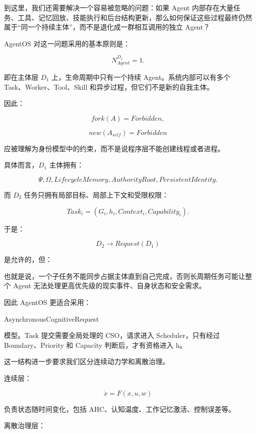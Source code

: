 到这里，我们还需要解决一个容易被忽略的问题：如果 Agent 内部存在大量任务、工具、记忆回放、技能执行和后台结构更新，那么如何保证这些过程最终仍然属于“同一个持续主体”，而不是退化成一群相互调用的独立 Agent？

AgentOS 对这一问题采用的基本原则是：

\[
\boxed{
N^{D_1}_{Agent}=1.
}
\]

即在主体层 $D_1$ 上，生命周期中只有一个持续 Agent。系统内部可以有多个 Task、Worker、Tool、Skill 和异步过程，但它们不是新的自我主体。

因此：

\[
fork(A)
=
Forbidden,
\]

\[
new(A_{self})
=
Forbidden
\]

应被理解为身份模型中的约束，而不是说程序层不能创建线程或者进程。

具体而言，$D_1$ 主体拥有：

\[
\Psi,\Omega,
LifecycleMemory,
AuthorityRoot,
PersistentIdentity.
\]

而 $D_2$ 任务只拥有局部目标、局部上下文和受限权限：

\[
Task_i
=
(G_i,h_i,Context_i,Capability_i).
\]

于是：

\[
D_2
\rightarrow
Request(D_1)
\]

是允许的，但：

\begin{statementbox}
\centering
{}
\end{statementbox}

也就是说，一个子任务不能同步占据主体直到自己完成，否则长周期任务可能让整个 Agent 无法处理更高优先级的现实事件、自身状态和安全需求。

因此 AgentOS 更适合采用：

\begin{statementbox}
AsynchronousCognitiveRequest
\end{statementbox}

模型。Task 提交需要全局处理的 CSO，请求进入 Scheduler，只有经过 Boundary、Priority 和 Capacity 判断后，才有资格进入 h。

这一结构进一步要求我们区分连续动力学和离散治理。

连续层：

\[
\dot x
=
F(x,u,w)
\]

负责状态随时间变化，包括 AHC、认知温度、工作记忆激活、控制误差等。

离散治理层：

